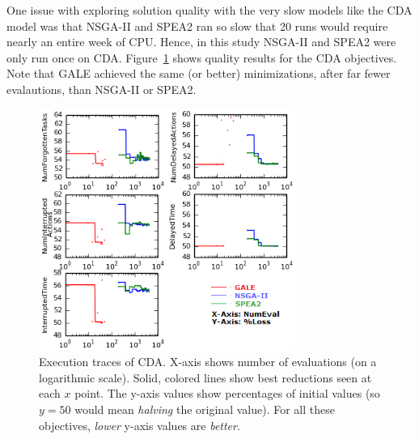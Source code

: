 \documentclass[10pt,journal,compsoc]{IEEEtran}
\newcommand{\fig}[1]{Figure~\ref{fig:#1}}
\begin{document}
One issue with exploring solution quality
with the very slow models like the CDA model was that NSGA-II and SPEA2 ran so slow that 20 runs would 
require nearly an entire week of CPU.
Hence, in this study NSGA-II and SPEA2 were
only run once on CDA.  \fig{cda} shows quality results for the CDA objectives.
Note that GALE achieved the same (or better) minimizations, after far fewer evalautions, than NSGA-II or SPEA2. 


\begin{figure}
\includegraphics[width=3.3in]{figures/cda.png}
\caption{Execution traces of CDA. X-axis shows number
of evaluations (on a logarithmic scale). 
Solid, colored lines  show  best reductions seen
at each $x$ point.
The y-axis values show percentages of initial values
(so $y=50$ would mean {\em halving} the original value).
For all these
objectives, {\em lower} y-axis values are {\em better}.
}\label{fig:cda} 
\end{figure}
\end{document}
